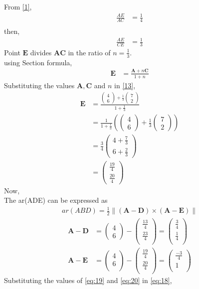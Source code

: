 \documentclass[12pt]{article}
\providecommand{\brak}[1]{\ensuremath{\left(#1\right)}}
\providecommand{\norm}[1]{\left\lVert#1\right\rVert}
\newcommand{\myvec}[1]{\ensuremath{\begin{pmatrix}#1\end{pmatrix}}}
\let\vec\mathbf
\begin{document}
\begin{enumerate}
From \eqref{1},
\begin{align}
\frac{AE}{AC} &=\frac{1}{4}\\
\end{align}
then,
\begin{align}
\frac{AE}{CE} &=\frac{1}{3}
\end{align}
Point $\vec{E}$ divides $\vec{A}\vec{C}$ in the ratio of $n = \frac{1}{3}$.\\
using Section formula,
\begin{align}
\vec{E} &=\frac{\vec{A}+n\vec{C}}{1+n}\label{13}
\end{align}
Substituting the values $\vec{A},\vec{C}$ and $n$ in \eqref{13},
\begin{align}
\vec{E} &=\frac{{\myvec{4\\6}+\frac{1}{3}\myvec{7\\2}}}{1+\frac{1}{3}}\\
	&=\frac{1}{1+\frac{1}{3}}\brak{{\myvec{4\\6}+\frac{1}{3}\myvec{7\\2}}} \\
	&=\frac{3}{4}\myvec{4+\frac{7}{3}\\[2pt]6+\frac{2}{3}}\\
	&=\myvec{\frac{19}{4}\\[2pt] \frac{20}{4}}
\end{align}
Now,\\
		The ar(ADE) can be expressed as
  \begin{align}
	  ar(ABD)=\frac{1}{2} \norm{\brak{\vec{A}-\vec{D}}  \times 
   \brak{\vec{A}- \vec{E}}} \label{eq:18} 
\end{align}
\begin{align}
	\vec{A}- \vec{D} &= \myvec{4\\6}-\myvec{\frac{13}{4}\\[2pt] \frac{23}{4}\\}=\myvec{\frac{3}{4}\\[2pt] \frac{1}{4}\\}\label{eq:19}\\
	  \vec{A}- \vec{E} &= \myvec{4\\6\\}-\myvec{\frac{19}{4}\\[2pt] \frac{20}{4}\\}=\myvec{\frac{-3}{4}\\[2pt]1\\}\label{eq:20}
  \end{align}
Substituting the values of \eqref{eq:19} and \eqref{eq:20} in \eqref{eq:18},

\end{enumerate}
\end{document}
